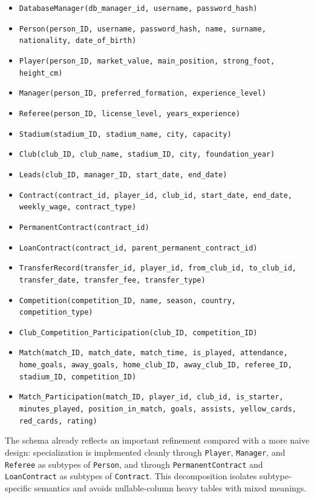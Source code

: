\documentclass[12pt,a4paper]{article}
\begin{document}
\begin{itemize}
    \item \texttt{DatabaseManager(db\_manager\_id, username, password\_hash)}
    \item \texttt{Person(person\_ID, username, password\_hash, name, surname, nationality, date\_of\_birth)}
    \item \texttt{Player(person\_ID, market\_value, main\_position, strong\_foot, height\_cm)}
    \item \texttt{Manager(person\_ID, preferred\_formation, experience\_level)}
    \item \texttt{Referee(person\_ID, license\_level, years\_experience)}
    \item \texttt{Stadium(stadium\_ID, stadium\_name, city, capacity)}
    \item \texttt{Club(club\_ID, club\_name, stadium\_ID, city, foundation\_year)}
    \item \texttt{Leads(club\_ID, manager\_ID, start\_date, end\_date)}
    \item \texttt{Contract(contract\_id, player\_id, club\_id, start\_date, end\_date, weekly\_wage, contract\_type)}
    \item \texttt{PermanentContract(contract\_id)}
    \item \texttt{LoanContract(contract\_id, parent\_permanent\_contract\_id)}
    \item \texttt{TransferRecord(transfer\_id, player\_id, from\_club\_id, to\_club\_id, transfer\_date, transfer\_fee, transfer\_type)}
    \item \texttt{Competition(competition\_ID, name, season, country, competition\_type)}
    \item \texttt{Club\_Competition\_Participation(club\_ID, competition\_ID)}
    \item \texttt{Match(match\_ID, match\_date, match\_time, is\_played, attendance, home\_goals, away\_goals, home\_club\_ID, away\_club\_ID, referee\_ID, stadium\_ID, competition\_ID)}
    \item \texttt{Match\_Participation(match\_ID, player\_id, club\_id, is\_starter, minutes\_played, position\_in\_match, goals, assists, yellow\_cards, red\_cards, rating)}
\end{itemize}

The schema already reflects an important refinement compared with a more naive design: specialization is implemented cleanly through \texttt{Player}, \texttt{Manager}, and \texttt{Referee} as subtypes of \texttt{Person}, and through \texttt{PermanentContract} and \texttt{LoanContract} as subtypes of \texttt{Contract}. This decomposition isolates subtype-specific semantics and avoids nullable-column heavy tables with mixed meanings.
\end{document}
